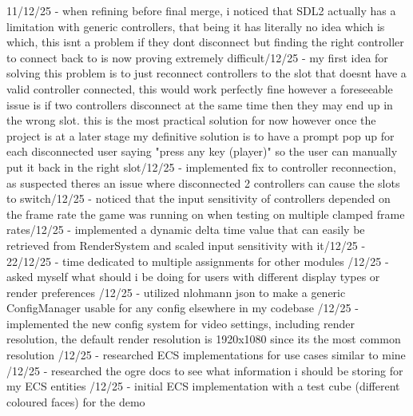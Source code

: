 \documentclass[]{final_report}
\begin{document}
11/12/25 - when refining before final merge, i noticed that SDL2 actually has a limitation with generic controllers, that being it has literally no idea which is which, this isnt a problem if they dont disconnect but finding the right controller to connect back to is now proving extremely difficult/12/25 - my first idea for solving this problem is to just reconnect controllers to the slot that doesnt have a valid controller connected, this would work perfectly fine however a foreseeable issue is if two controllers disconnect at the same time then they may end up in the wrong slot. this is the most practical solution for now however once the project is at a later stage my definitive solution is to have a prompt pop up for each disconnected user saying "press any key (player)" so the user can manually put it back in the right slot/12/25 - implemented fix to controller reconnection, as suspected theres an issue where disconnected 2 controllers can cause the slots to switch/12/25 - noticed that the input sensitivity of controllers depended on the frame rate the game was running on when testing on multiple clamped frame rates/12/25 - implemented a dynamic delta time value that can easily be retrieved from RenderSystem and scaled input sensitivity with it/12/25 - 22/12/25 - time dedicated to multiple assignments for other modules /12/25 - asked myself what should i be doing for users with different display types or render preferences /12/25 - utilized nlohmann json to make a generic ConfigManager usable for any config elsewhere in my codebase /12/25 - implemented the new config system for video settings, including render resolution, the default render resolution is 1920x1080 since its the most common resolution /12/25 - researched ECS implementations for use cases similar to mine /12/25 - researched the ogre docs to see what information i should be storing for my ECS entities /12/25 - initial ECS implementation with a test cube (different coloured faces) for the demo \newline
\end{document}
